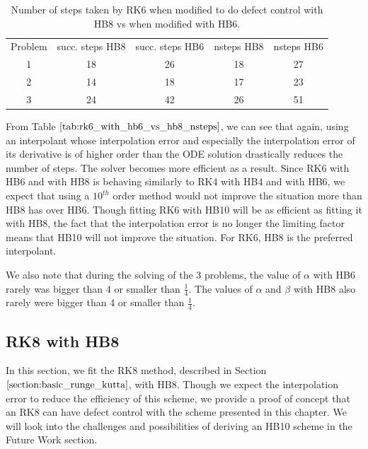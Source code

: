 \begin{table}[h]
\caption {Number of steps taken by RK6 when modified to do defect control with HB8 vs when modified with HB6.} \label{tab:rk6_with_hb6_vs_hb8_nsteps}
\begin{center}
\begin{tabular}{ c c c c c } 
Problem & succ. steps HB8 & succ. steps HB6 & nsteps HB8 & nsteps HB6 \\ 
1       & 18                 &        26          & 18         & 27\\ 
2       & 14                 &        18          & 17         & 23\\
3       & 24                 &        42          & 26         & 51\\
\end{tabular}
\end{center}
\end{table}

From Table $\ref{tab:rk6_with_hb6_vs_hb8_nsteps}$, we can see that again, using an interpolant whose interpolation error and especially the interpolation error of its derivative is of higher order than the ODE solution drastically reduces the number of steps. The solver becomes more efficient as a result. Since RK6 with HB6 and with HB8 is behaving similarly to RK4 with HB4 and with HB6, we expect that using a $10^{th}$ order method would not improve the situation more than HB8 has over HB6. Though fitting RK6 with HB10 will be as efficient as fitting it with HB8, the fact that the interpolation error is no longer the limiting factor means that HB10 will not improve the situation. For RK6, HB8 is the preferred interpolant.  

We also note that during the solving of the 3 problems, the value of $\alpha$ with HB6 rarely was bigger than 4 or smaller than $\frac{1}{4}$. The values of $\alpha$ and $\beta$ with HB8 also rarely were bigger than 4 or smaller than $\frac{1}{4}$. 

\subsection{RK8 with HB8}
In this section, we fit the RK8 method, described in Section $\ref{section:basic_runge_kutta}$, with HB8. Though we expect the interpolation error to reduce the efficiency of this scheme, we provide a proof of concept that an RK8 can have defect control with the scheme presented in this chapter. We will look into the challenges and possibilities of deriving an HB10 scheme in the Future Work section. 

